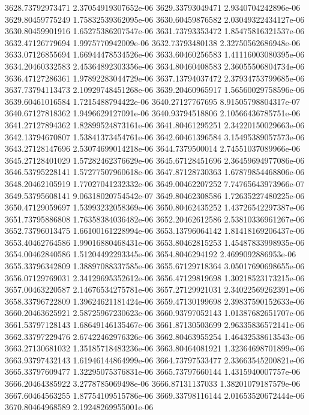 {3628.73792973471 2.37054919307652e-06
3629.33793049471 2.9340704242896e-06
3629.80459775249 1.75832539362095e-06
3630.60459876582 2.03049322434127e-06
3630.80459901916 1.65275386207547e-06
3631.73793353472 1.85475816321537e-06
3632.47126779694 1.9975770942009e-06
3632.73793480138 2.32750562686948e-06
3633.07126855694 1.66944478534526e-06
3633.60460256583 1.41116003080395e-06
3634.20460332583 2.45364892303356e-06
3634.80460408583 2.36055506804734e-06
3636.47127286361 1.97892283044729e-06
3637.13794037472 2.37934753799685e-06
3637.73794113473 2.10929748451268e-06
3639.20460965917 1.56560029758596e-06
3639.60461016584 1.7215488794422e-06
3640.27127767695 8.91505798804317e-07
3640.67127818362 1.9496629127091e-06
3640.93794518806 2.10566436785751e-06
3641.27127894362 1.82899524873161e-06
3641.80461295251 2.34220150029663e-06
3642.13794670807 1.53841373454761e-06
3642.60461396584 3.15495389057573e-06
3643.27128147696 2.53074699014218e-06
3644.7379500014 2.74551037089966e-06
3645.27128401029 1.57282462376629e-06
3645.67128451696 2.36459694977086e-06
3646.53795228141 1.57277507960618e-06
3647.87128730363 1.67879854468806e-06
3648.20462105919 1.77027041232332e-06
3649.00462207252 7.74765643973966e-07
3649.53795608141 9.06318020754542e-07
3649.80462308586 1.72635227480225e-06
3650.47129059697 1.53993232058369e-06
3650.80462435252 1.43726542297387e-06
3651.73795886808 1.76358384036482e-06
3652.20462612586 2.53810336961267e-06
3652.73796013475 1.66100161228994e-06
3653.13796064142 1.81418169206437e-06
3653.40462764586 1.99016880468431e-06
3653.80462815253 1.45487833998935e-06
3654.00462840586 1.51204492293345e-06
3654.8046294192 2.4699092886953e-06
3655.33796342809 1.38897088337585e-06
3655.67129718364 3.05017690698655e-06
3656.07129769031 2.34129695352612e-06
3656.47129819698 1.30218523173215e-06
3657.00463220587 2.14676534275781e-06
3657.27129921031 2.34022569262391e-06
3658.33796722809 1.39624621181424e-06
3659.47130199698 2.39837590152633e-06
3660.20463625921 2.58725967230623e-06
3660.93797052143 1.01387682651707e-06
3661.53797128143 1.68649146135467e-06
3661.87130503699 2.96335836572141e-06
3662.33797229476 2.67422462976326e-06
3662.80463955254 1.46432538613543e-06
3663.27130681032 1.35185718483236e-06
3663.80464081921 1.32364698701899e-06
3663.93797432143 1.61946144864999e-06
3664.73797533477 2.33663545200821e-06
3665.33797609477 1.32295075376831e-06
3665.73797660144 1.4315940007757e-06
3666.20464385922 3.2778785069498e-06
3666.87131137033 1.38201079187579e-06
3667.60464563255 1.87754109515786e-06
3669.33798116144 2.01653520672444e-06
3670.80464968589 2.19248269955001e-06
}
